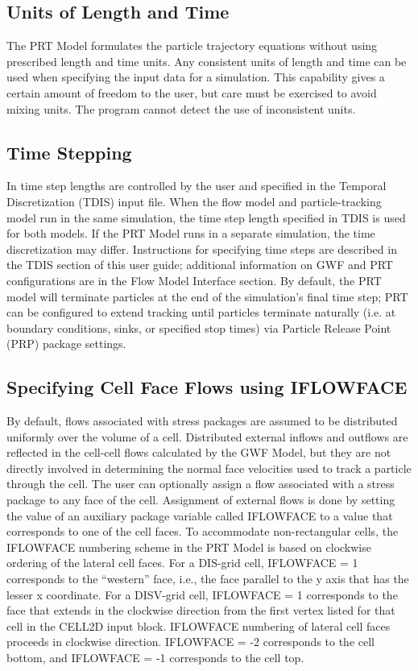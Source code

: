 \subsection{Units of Length and Time}
The PRT Model formulates the particle trajectory equations without using prescribed length and time units. Any consistent units of length and time can be used when specifying the input data for a simulation. This capability gives a certain amount of freedom to the user, but care must be exercised to avoid mixing units.  The program cannot detect the use of inconsistent units.

\subsection{Time Stepping}
In \mf time step lengths are controlled by the user and specified in the Temporal Discretization (TDIS) input file.  When the flow model and particle-tracking model run in the same simulation, the time step length specified in TDIS is used for both models.  If the PRT Model runs in a separate simulation, the time discretization may differ.  Instructions for specifying time steps are described in the TDIS section of this user guide; additional information on GWF and PRT configurations are in the Flow Model Interface section.  By default, the PRT model will terminate particles at the end of the simulation's final time step; PRT can be configured to extend tracking until particles terminate naturally (i.e. at boundary conditions, sinks, or specified stop times) via Particle Release Point (PRP) package settings.

\subsection{Specifying Cell Face Flows using IFLOWFACE}

By default, flows associated with stress packages are assumed to be distributed uniformly over the volume of a cell. Distributed external inflows and outflows are reflected in the cell-cell flows calculated by the GWF Model, but they are not directly involved in determining the normal face velocities used to track a particle through the cell. The user can optionally assign a flow associated with a stress package to any face of the cell. Assignment of external flows is done by setting the value of an auxiliary package variable called IFLOWFACE to a value that corresponds to one of the cell faces. To accommodate non-rectangular cells, the IFLOWFACE numbering scheme in the PRT Model is based on clockwise ordering of the lateral cell faces. For a DIS-grid cell, IFLOWFACE = 1 corresponds to the ``western'' face, i.e., the face parallel to the y axis that has the lesser x coordinate. For a DISV-grid cell, IFLOWFACE = 1 corresponds to the face that extends in the clockwise direction from the first vertex listed for that cell in the CELL2D input block. IFLOWFACE numbering of lateral cell faces proceeds in clockwise direction. IFLOWFACE = -2 corresponds to the cell bottom, and IFLOWFACE = -1 corresponds to the cell top.

